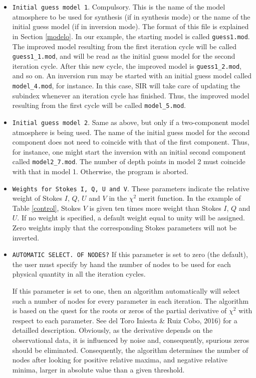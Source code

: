 \begin{itemize}
\item {\tt Initial guess model 1}. Compulsory. This is the name of the model
atmosphere to be used for synthesis (if in synthesis mode) or the name of 
the initial guess model (if in inversion mode). The format of this file is
explained in Section \ref{modelo}. In our example, the starting model
is called {\tt guess1.mod}. The improved model resulting from the first iteration
cycle will be called {\tt guess1\_1.mod}, and will be read as the initial guess model
for the second iteration cycle. After this new cycle, the improved model is
{\tt guess1\_2.mod}, and so on. An inversion run may be started with an initial
guess model called {\tt model\_4.mod}, for instance. In this case, SIR will take
care of updating the subindex whenever an iteration cycle has finished. Thus, the
improved model resulting from the first cycle will be called {\tt model\_5.mod}. 

\item {\tt Initial guess model 2}. Same as above, but only if a two-component 
model atmosphere is being used. The name of the initial guess model for the second
component does not need to coincide with that of the first component. Thus, 
for instance, one might start the inversion with an initial second component
called {\tt model2\_7.mod}. The number of depth points in model 2 must coincide
with that in model 1. Otherwise, the program is aborted.

\item {\tt Weights for Stokes I, Q, U and V}. These parameters indicate
the relative weight of Stokes $I$, $Q$, $U$ and $V$ in the $\chi^2$
merit function. In the example of Table \ref{control}, Stokes $V$ is
given ten times more weight than Stokes $I$, $Q$ and $U$. If no weight
is specified, a default weight equal to unity will be assigned. Zero
weights imply that the corresponding Stokes parameters will not be
inverted.

\item {\tt AUTOMATIC SELECT. OF NODES?} If this parameter is set to
zero (the default), the user must specify by hand the number of nodes
to be used for each physical quantity in all the iteration cycles. 

If this parameter is set to one, then an algorithm automatically will select such
a number of nodes for every parameter in each iteration. The algorithm is based on
the quest for the roots or zeros of the partial derivative of $\chi^2$
with respect to each parameter. See del Toro Iniesta \& Ruiz 
Cobo, 2016) for a detailled description. Obviously, as the derivative depends 
on the observational data, it is influenced
by noise and, consequently, spurious zeros should be eliminated. Consequently, the
algorithm determines the number of nodes after looking for positive relative maxima, 
and negative relative minima, larger in absolute value than a given threshold.


\end{itemize}
